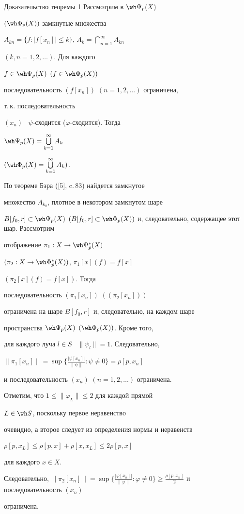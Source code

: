\begin{pf*}{Доказательство теоремы 1} Рассмотрим в $\wh \Psi_{p}(X)$


$(\wh \Phi_{p}(X))$ замкнутые множества


$A_{kn} = \{f : |f[x_{n}]| \leq k \}$, $A_{k}


=\bigcap \limits_{n=1}^{\infty}A_{kn}$


$(k,n =1,2,\dotsc )$. Для каждого


$f \in \wh \Psi_{p}(X)$ $(f \in \wh \Phi_{p}(X))$


последовательность $(f[x_{n}])$ $(n =1,2,\dotsc )$ ограничена,


т.\,к. последовательность


$(x_{n})$ \ $\psi$-сходится ($\varphi$-сходится). Тогда


$\wh \Psi_{p}(X)= \bigcup \limits_{k=1}^{\infty}A_{k}$


$(\wh \Phi_{p}(X) = \bigcup \limits_{k=1}^{\infty}A_{k})$.


По теореме Бэра ([5], c.\,83) найдется замкнутое 


множество $A_{k_{0}}$, плотное в некотором замкнутом шаре


$B[f_{0},r] \subset \wh \Psi_{p}(X)$ $(B[f_{0},r] \subset


\wh \Phi_{p}(X))$ и, следовательно, содержащее этот шар. Рассмотрим 


отображение $\pi_{1} : X \rightarrow \wh \Psi_{p}^{*}(X)$


$(\pi_{2} : X \rightarrow \wh \Phi_{p}^{*}(X))$, $\pi_{1}[x](f) = f[x]$


$(\pi_{2}[x](f) = f[x])$. Тогда


последовательность $(\pi_{1}[x_{n}])$  $((\pi_{2}[x_{n}]))$


ограничена на шаре $B[f_{0},r]$ и, следовательно, на каждом шаре


пространства $\wh \Psi_{p}(X)$ $(\wh \Phi_{p}(X))$. Кроме того,


для каждого луча $l \in S$ \ $\|\psi _{l}\|= 1$. Следовательно,


$\|\pi_{1}[x_{n}]\| = \sup\{\frac{|\psi[x_{n}]|}{\|\psi\|} :


\psi \neq 0\} = \rho[p,x_{n}]$


и последовательность $(x_{n})$ $(n =1,2,\dotsc)$ ограничена.


Отметим, что $1 \leq \|\varphi_{L}\| \leq 2$ для каждой прямой


$L \in \wh S$, поскольку первое неравенство


очевидно, а второе следует из определения нормы и неравенств


$\rho[p,x_{L}] \leq \rho[p,x] + \rho[x,x_{L}] \leq 2\rho[p,x]$


для каждого $x \in X$.


Следовательно, $\|\pi_{2}[x_{n}]\| =


\sup\{\frac{|\varphi[x_{n}]|}{\|\varphi\|} : \varphi \neq 0\} \geq


\frac{\rho[p,x_{n}]}{2}$ и последовательность $(x_{n})$


ограничена.


\end{pf*}
